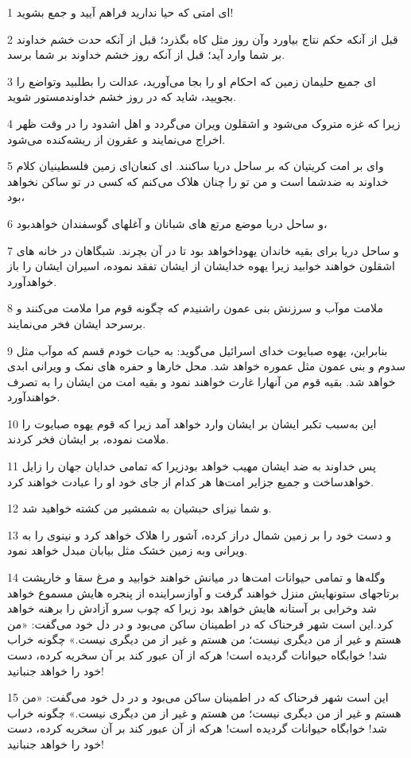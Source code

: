 \par 1 ای امتی که حیا ندارید فراهم آیید و جمع بشوید!
\par 2 قبل از آنکه حکم نتاج بیاورد وآن روز مثل کاه بگذرد؛ قبل از آنکه حدت خشم خداوند بر شما وارد آید؛ قبل از آنکه روز خشم خداوند بر شما برسد.
\par 3 ‌ای جمیع حلیمان زمین که احکام او را بجا می‌آورید، عدالت را بطلبید وتواضع را بجویید، شاید که در روز خشم خداوندمستور شوید.
\par 4 زیرا که غزه متروک می‌شود و اشقلون ویران می‌گردد و اهل اشدود را در وقت ظهر اخراج می‌نمایند و عقرون از ریشه‌کنده می‌شود.
\par 5 وای بر امت کریتیان که بر ساحل دریا ساکنند. ای کنعان‌ای زمین فلسطینیان کلام خداوند به ضدشما است و من تو را چنان هلاک می‌کنم که کسی در تو ساکن نخواهد بود،
\par 6 و ساحل دریا موضع مرتع های شبانان و آغلهای گوسفندان خواهدبود،
\par 7 و ساحل دریا برای بقیه خاندان یهوداخواهد بود تا در آن بچرند. شبگاهان در خانه های اشقلون خواهند خوابید زیرا یهوه خدایشان از ایشان تفقد نموده، اسیران ایشان را باز خواهدآورد.
\par 8 ملامت موآب و سرزنش بنی عمون راشنیدم که چگونه قوم مرا ملامت می‌کنند و برسرحد ایشان فخر می‌نمایند.
\par 9 بنابراین، یهوه صبایوت خدای اسرائیل می‌گوید: به حیات خودم قسم که موآب مثل سدوم و بنی عمون مثل عموره خواهد شد. محل خارها و حفره های نمک و ویرانی ابدی خواهد شد. بقیه قوم من آنهارا غارت خواهند نمود و بقیه امت من ایشان را به تصرف خواهند‌آورد.
\par 10 این به‌سبب تکبر ایشان بر ایشان وارد خواهد آمد زیرا که قوم یهوه صبایوت را ملامت نموده، بر ایشان فخر کردند.
\par 11 پس خداوند به ضد ایشان مهیب خواهد بودزیرا که تمامی خدایان جهان را زایل خواهدساخت و جمیع جزایر امت‌ها هر کدام از جای خود او را عبادت خواهند کرد.
\par 12 و شما نیز‌ای حبشیان به شمشیر من کشته خواهید شد.
\par 13 و دست خود را بر زمین شمال دراز کرده، آشور را هلاک خواهد کرد و نینوی را به ویرانی وبه زمین خشک مثل بیابان مبدل خواهد نمود.
\par 14 وگله‌ها و تمامی حیوانات امت‌ها در میانش خواهند خوابید و مرغ سقا و خارپشت برتاجهای ستونهایش منزل خواهند گرفت و آوازسراینده از پنجره هایش مسموع خواهد شد وخرابی بر آستانه هایش خواهد بود زیرا که چوب سرو آزادش را برهنه خواهد کرد.این است شهر فرحناک که در اطمینان ساکن می‌بود و در دل خود می‌گفت: «من هستم و غیر از من دیگری نیست؛ من هستم و غیر از من دیگری نیست.» چگونه خراب شد! خوابگاه حیوانات گردیده است! هر‌که از آن عبور کند بر آن سخریه کرده، دست خود را خواهد جنبانید!
\par 15 این است شهر فرحناک که در اطمینان ساکن می‌بود و در دل خود می‌گفت: «من هستم و غیر از من دیگری نیست؛ من هستم و غیر از من دیگری نیست.» چگونه خراب شد! خوابگاه حیوانات گردیده است! هر‌که از آن عبور کند بر آن سخریه کرده، دست خود را خواهد جنبانید!

